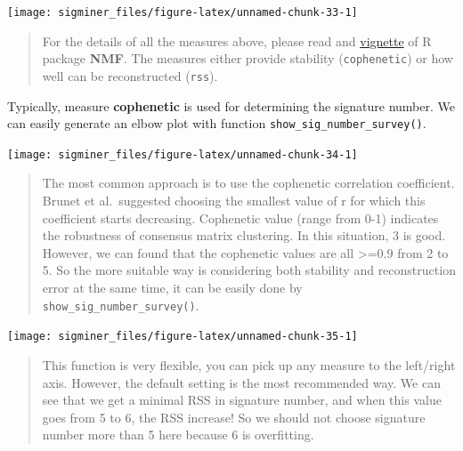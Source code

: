\documentclass[
  12pt,
  a4paper,
  twoside]{book}
\newenvironment{Shaded}{\begin{snugshade}}{\end{snugshade}}
\newcommand{\AttributeTok}[1]{\textcolor[rgb]{0.77,0.63,0.00}{#1}}
\newcommand{\ConstantTok}[1]{\textcolor[rgb]{0.00,0.00,0.00}{#1}}
\newcommand{\FunctionTok}[1]{\textcolor[rgb]{0.00,0.00,0.00}{#1}}
\newcommand{\NormalTok}[1]{#1}
\newcommand{\SpecialCharTok}[1]{\textcolor[rgb]{0.00,0.00,0.00}{#1}}
\begin{document}
\texttt{[image: sigminer\_files/figure-latex/unnamed-chunk-33-1]}

\begin{quote}
For the details of all the measures above, please read \citet{gaujoux2010flexible} and \href{https://cran.r-project.org/web/packages/NMF/vignettes/}{vignette} of R package \textbf{NMF}.
The measures either provide stability (\texttt{cophenetic}) or how well can be reconstructed (\texttt{rss}).
\end{quote}

Typically, measure \textbf{cophenetic} is used for determining the signature number. We can easily generate an elbow plot
with function \texttt{show\_sig\_number\_survey()}.

\begin{Shaded}
\end{Shaded}

\texttt{[image: sigminer\_files/figure-latex/unnamed-chunk-34-1]}

\begin{quote}
The most common approach is to use the cophenetic correlation coefficient. Brunet et al.~suggested choosing the smallest value of r for which this coefficient starts decreasing. \citep{gaujoux2010flexible}
Cophenetic value (range from 0-1) indicates the robustness of consensus matrix clustering. In this situation, 3 is good. However, we can found that the cophenetic values are all \textgreater=0.9 from 2 to 5. So the more suitable way is considering both stability and reconstruction error at the same time, it can be easily done by \texttt{show\_sig\_number\_survey()}.
\end{quote}

\begin{Shaded}
\end{Shaded}

\texttt{[image: sigminer\_files/figure-latex/unnamed-chunk-35-1]}

\begin{quote}
This function is very flexible, you can pick up any measure to the left/right axis. However, the default setting is the most recommended way.
We can see that we get a minimal RSS in signature number, and when this value goes from 5 to 6, the RSS increase! So we should not choose signature number more than 5 here because 6 is overfitting.
\end{quote}
\end{document}
